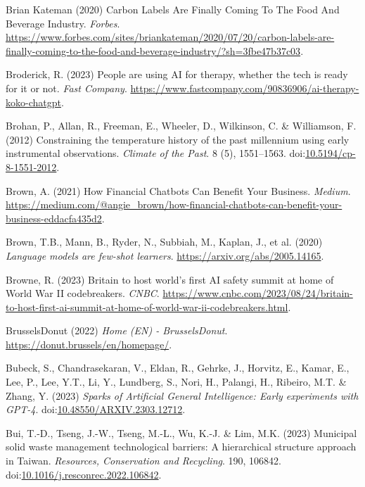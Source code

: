 \documentclass[
  letterpaper,
  DIV=11,
  numbers=noendperiod]{scrartcl}
\newlength{\cslhangindent}
\newenvironment{CSLReferences}[2] %
 {\begin{list}{}{%
  \setlength{\itemindent}{0pt}
  \setlength{\leftmargin}{0pt}
  \setlength{\parsep}{0pt}
  \ifodd #1
   \setlength{\leftmargin}{\cslhangindent}
   \setlength{\itemindent}{-1\cslhangindent}
  \fi
  \setlength{\itemsep}{#2\baselineskip}}}
 {\end{list}}
\begin{document}
\begin{CSLReferences}{0}{1}
Brian Kateman (2020) Carbon {Labels Are Finally Coming To The Food And
Beverage Industry}. \emph{Forbes}.
\url{https://www.forbes.com/sites/briankateman/2020/07/20/carbon-labels-are-finally-coming-to-the-food-and-beverage-industry/?sh=3fbe47b37c03}.

Broderick, R. (2023) People are using {AI} for therapy, whether the tech
is ready for it or not. \emph{Fast Company}.
\url{https://www.fastcompany.com/90836906/ai-therapy-koko-chatgpt}.

Brohan, P., Allan, R., Freeman, E., Wheeler, D., Wilkinson, C. \&
Williamson, F. (2012) Constraining the temperature history of the past
millennium using early instrumental observations. \emph{Climate of the
Past}. 8 (5), 1551--1563.
doi:\href{https://doi.org/10.5194/cp-8-1551-2012}{10.5194/cp-8-1551-2012}.

Brown, A. (2021) How {Financial Chatbots Can Benefit Your Business}.
\emph{Medium}.
\url{https://medium.com/@angie_brown/how-financial-chatbots-can-benefit-your-business-eddacfa435d2}.

Brown, T.B., Mann, B., Ryder, N., Subbiah, M., Kaplan, J., et al. (2020)
\emph{Language models are few-shot learners}.
\url{https://arxiv.org/abs/2005.14165}.

Browne, R. (2023) Britain to host world's first {AI} safety summit at
home of {World War II} codebreakers. \emph{CNBC}.
\url{https://www.cnbc.com/2023/08/24/britain-to-host-first-ai-summit-at-home-of-world-war-ii-codebreakers.html}.

BrusselsDonut (2022) \emph{Home ({EN}) - {BrusselsDonut}}.
\url{https://donut.brussels/en/homepage/}.

Bubeck, S., Chandrasekaran, V., Eldan, R., Gehrke, J., Horvitz, E.,
Kamar, E., Lee, P., Lee, Y.T., Li, Y., Lundberg, S., Nori, H., Palangi,
H., Ribeiro, M.T. \& Zhang, Y. (2023) \emph{Sparks of {Artificial
General Intelligence}: {Early} experiments with {GPT-4}}.
doi:\href{https://doi.org/10.48550/ARXIV.2303.12712}{10.48550/ARXIV.2303.12712}.

Bui, T.-D., Tseng, J.-W., Tseng, M.-L., Wu, K.-J. \& Lim, M.K. (2023)
Municipal solid waste management technological barriers: {A}
hierarchical structure approach in {Taiwan}. \emph{Resources,
Conservation and Recycling}. 190, 106842.
doi:\href{https://doi.org/10.1016/j.resconrec.2022.106842}{10.1016/j.resconrec.2022.106842}.


\end{CSLReferences}
\end{document}
